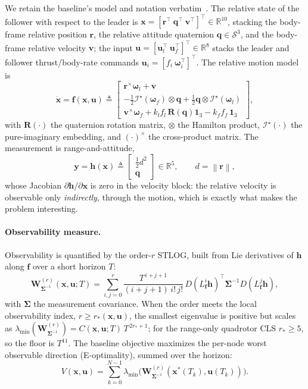 \documentclass[11pt]{article}
\newcommand{\norm}[1]{\left\lVert#1\right\rVert}
\newcommand{\Real}{\mathbb{R}}
\newcommand{\Wstlog}{\bm{W}^{(r)}_{\bm{\Sigma}^{-1}}}
\newcommand{\Lf}{L_{\bm{f}}}
\begin{document}
We retain the baseline's model and notation verbatim~\cite{jgcd}. The relative state of the
follower with respect to the leader is $\bm{x} = [\bm{r}^\top\ \bm{q}^\top\ \bm{v}^\top]^\top
\in \Real^{10}$, stacking the body-frame relative position $\bm{r}$, the relative attitude
quaternion $\bm{q}\in\mathcal{S}^3$, and the body-frame relative velocity $\bm{v}$; the input
$\bm{u} = [\bm{u}_l^\top\ \bm{u}_f^\top]^\top \in \Real^{8}$ stacks the leader and follower
thrust/body-rate commands $\bm{u}_i = [f_i\ \bm{\omega}_i^\top]^\top$. The relative motion model is
\begin{equation}\label{eq:dyn}
  \dot{\bm{x}} = \bm{f}(\bm{x},\bm{u}) \triangleq
  \begin{bmatrix}
    \bm{r}^\times\bm{\omega}_l + \bm{v} \\[2pt]
    -\tfrac{1}{2}\mathcal{I}^\star(\bm{\omega}_f)\otimes\bm{q}
      + \tfrac{1}{2}\bm{q}\otimes\mathcal{I}^\star(\bm{\omega}_l) \\[2pt]
    \bm{v}^\times\bm{\omega}_f + k_l f_l\,\bm{R}(\bm{q})\bm{1}_3 - k_f f_f\,\bm{1}_3
  \end{bmatrix},
\end{equation}
with $\bm{R}(\cdot)$ the quaternion rotation matrix, $\otimes$ the Hamilton product,
$\mathcal{I}^\star(\cdot)$ the pure-imaginary embedding, and $(\cdot)^\times$ the cross-product
matrix. The measurement is range-and-attitude,
\begin{equation}\label{eq:obs}
  \bm{y} = \bm{h}(\bm{x}) \triangleq
  \begin{bmatrix} \tfrac{1}{2}d^2 \\ \bm{q} \end{bmatrix} \in \Real^{5},
  \qquad d = \norm{\bm{r}},
\end{equation}
whose Jacobian $\partial\bm{h}/\partial\bm{x}$ is zero in the velocity block: the relative
velocity is observable only \emph{indirectly}, through the motion, which is exactly what makes the
problem interesting.

\paragraph{Observability measure.} Observability is quantified by the order-$r$ STLOG, built from
Lie derivatives of $\bm{h}$ along $\bm{f}$ over a short horizon $T$:
\begin{equation}\label{eq:stlog}
  \Wstlog(\bm{x},\bm{u};T) =
  \sum_{i,j=0}^{r} \frac{T^{\,i+j+1}}{(i+j+1)\,i!\,j!}\,
  D\!\left(\Lf^i\bm{h}\right)^{\!\top}\bm{\Sigma}^{-1} D\!\left(\Lf^j\bm{h}\right),
\end{equation}
with $\bm{\Sigma}$ the measurement covariance. When the order meets the local observability index,
$r \ge r_*(\bm{x},\bm{u})$, the smallest eigenvalue is positive but scales as
$\lambda_{\min}(\Wstlog) = C(\bm{x},\bm{u};T)\,T^{\,2r_*+1}$; for the range-only quadrotor CLS
$r_* \ge 5$, so the floor is $T^{11}$. The baseline objective maximizes the per-node worst observable
direction (E-optimality), summed over the horizon:
\begin{equation}\label{eq:Vbase}
  V(\bm{x},\bm{u}) = \sum_{k=0}^{N-1}
  \lambda_{\min}\!\big(\Wstlog(\bm{x}^*(T_k),\bm{u}(T_k))\big).
\end{equation}
\end{document}
